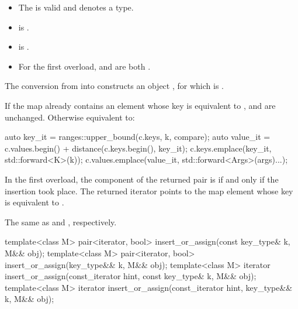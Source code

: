 \begin{itemdescr}
\pnum
\constraints
\begin{itemize}
\item
The  
is valid and denotes a type.
\item
{} is .
\item
{} is .
\item
For the first overload,
 and
 are both .
\end{itemize}

\pnum
\expects
The conversion from  into  constructs
an object ,
for which  is .

\pnum
\effects
If the map already contains an element whose key is equivalent to ,
 and  are unchanged.
Otherwise equivalent to:
\begin{codeblock}
auto key_it = ranges::upper_bound(c.keys, k, compare);
auto value_it = c.values.begin() + distance(c.keys.begin(), key_it);
c.keys.emplace(key_it, std::forward<K>(k));
c.values.emplace(value_it, std::forward<Args>(args)...);
\end{codeblock}

\pnum
\returns
In the first overload,
the  component of the returned pair is 
if and only if the insertion took place.
The returned iterator points to the map element
whose key is equivalent to .

\pnum
\complexity
The same as  and , respectively.
\end{itemdescr}

%
\begin{itemdecl}
template<class M>
  pair<iterator, bool> insert_or_assign(const key_type& k, M&& obj);
template<class M>
  pair<iterator, bool> insert_or_assign(key_type&& k, M&& obj);
template<class M>
  iterator insert_or_assign(const_iterator hint, const key_type& k, M&& obj);
template<class M>
  iterator insert_or_assign(const_iterator hint, key_type&& k, M&& obj);
\end{itemdecl}

